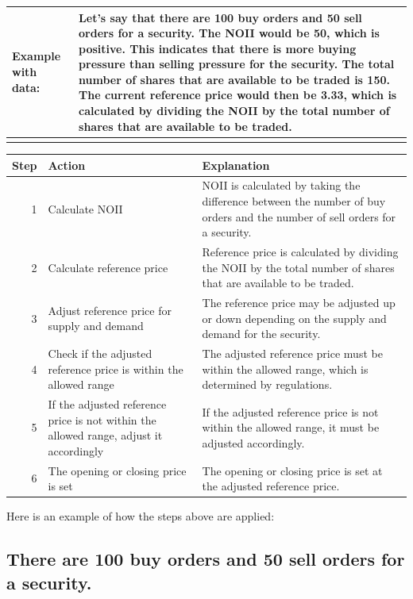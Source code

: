 \documentclass[11pt]{article}
\begin{document}
\begin{center}
\begin{tabular}{ll}
\textbf{\textbf{Example with data:}} & Let's say that there are 100 buy orders and 50 sell orders for a security. The NOII would be 50, which is positive. This indicates that there is more buying pressure than selling pressure for the security. The total number of shares that are available to be traded is 150. The current reference price would then be 3.33, which is calculated by dividing the NOII by the total number of shares that are available to be traded.\\[0pt]
\hline
 & \\[0pt]
\end{tabular}
\end{center}

\begin{center}
\begin{tabular}{rll}
\hline
\textbf{\textbf{Step}} & \textbf{\textbf{Action}} & \textbf{\textbf{Explanation}}\\[0pt]
\hline
1 & Calculate NOII & NOII is calculated by taking the difference between the number of buy orders and the number of sell orders for a security.\\[0pt]
2 & Calculate reference price & Reference price is calculated by dividing the NOII by the total number of shares that are available to be traded.\\[0pt]
3 & Adjust reference price for supply and demand & The reference price may be adjusted up or down depending on the supply and demand for the security.\\[0pt]
4 & Check if the adjusted reference price is within the allowed range & The adjusted reference price must be within the allowed range, which is determined by regulations.\\[0pt]
5 & If the adjusted reference price is not within the allowed range, adjust it accordingly & If the adjusted reference price is not within the allowed range, it must be adjusted accordingly.\\[0pt]
6 & The opening or closing price is set & The opening or closing price is set at the adjusted reference price.\\[0pt]
\hline
\end{tabular}
\end{center}

Here is an example of how the steps above are applied:

\subsection{There are 100 buy orders and 50 sell orders for a security.}
\label{sec:org5cbd744}
\end{document}
